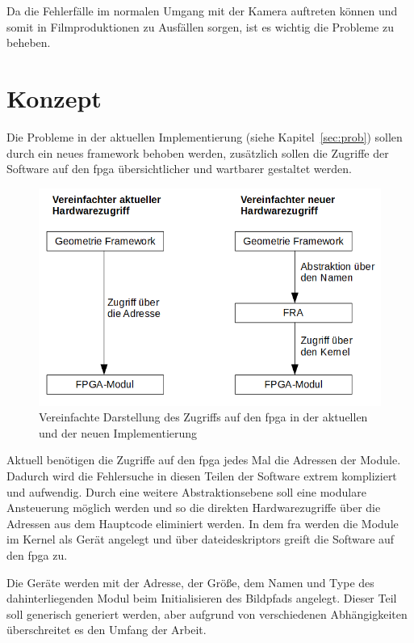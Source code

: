 Da die Fehlerfälle im normalen Umgang mit der Kamera auftreten können und somit in Filmproduktionen zu Ausfällen sorgen, ist es wichtig die Probleme zu beheben.


\section{Konzept}\label{sec:konzept}
Die Probleme in der aktuellen Implementierung (siehe Kapitel~\ref{sec:prob}) sollen durch ein neues \gls{framework} behoben werden, zusätzlich sollen die Zugriffe der Software auf den \ac{fpga} übersichtlicher und wartbarer gestaltet werden.

\begin{figure}[!hbtp]
	\centering
	\includegraphics[width = 0.9\linewidth]{pictures/2019-11-17_ImplementierungNewvsOld.png}
	\smallskip
	\caption{Vereinfachte Darstellung des Zugriffs auf den \ac{fpga} in der aktuellen und der neuen Implementierung}
	\label{fig:newvsold}
\end{figure} 



Aktuell benötigen die Zugriffe auf den \ac{fpga} jedes Mal die Adressen der Module. Dadurch wird die Fehlersuche in diesen Teilen der Software extrem kompliziert und aufwendig. Durch eine weitere Abstraktionsebene soll eine modulare Ansteuerung möglich werden und so die direkten Hardwarezugriffe über die Adressen aus dem Hauptcode eliminiert werden. In dem \ac{fra} werden die Module im Kernel als Gerät angelegt und über \glspl{dateideskriptor} greift die Software auf den \ac{fpga} zu.


Die Geräte werden mit der Adresse, der Größe, dem Namen und Type des dahinterliegenden Modul beim Initialisieren des Bildpfads angelegt. Dieser Teil soll generisch generiert werden, aber aufgrund von verschiedenen Abhängigkeiten überschreitet es den Umfang der Arbeit.


